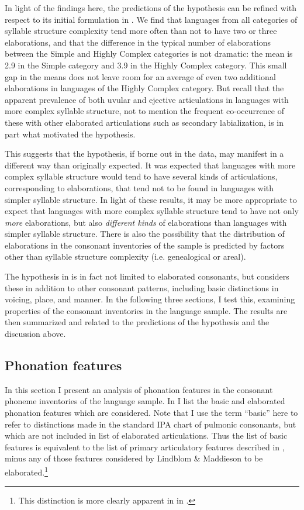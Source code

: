   In light of the findings here, the predictions of the hypothesis can be refined with respect to its initial formulation in . We find that languages from all categories of syllable structure complexity tend more often than not to have two or three elaborations, and that the difference in the typical number of elaborations between the Simple and Highly Complex categories is not dramatic: the mean is 2.9 in the Simple category and 3.9 in the Highly Complex category. This small gap in the means does not leave room for an average of even two additional elaborations in languages of the Highly Complex category. But recall that the apparent prevalence of both uvular and ejective articulations in languages with more complex syllable structure, not to mention the frequent co-occurrence of these with other elaborated articulations such as secondary labialization, is in part what motivated the hypothesis.

  This suggests that the hypothesis, if borne out in the data, may manifest in a different way than originally expected. It was expected that languages with more complex syllable structure would tend to have several kinds of articulations, corresponding to elaborations, that tend not to be found in languages with simpler syllable structure. In light of these results, it may be more appropriate to expect that languages with more complex syllable structure tend to have not only \textit{more} elaborations, but also \textit{different kinds} of elaborations than languages with simpler syllable structure. There is also the possibility that the distribution of elaborations in the consonant inventories of the sample is predicted by factors other than syllable structure complexity (i.e. genealogical or areal).

  The hypothesis in  is in fact not limited to elaborated consonants, but considers these in addition to other consonant patterns, including basic distinctions in voicing, place, and manner. In the following three sections, I test this, examining properties of the consonant inventories in the language sample. The results are then summarized and related to the predictions of the hypothesis and the discussion above.

\subsection{Phonation features}\label{sec:4.4.3}

  In this section I present an analysis of phonation features in the consonant pho\-neme inventories of the language sample. In  I list the basic and elaborated phonation features which are considered. Note that I use the term ``basic'' here to refer to distinctions made in the standard IPA chart of pulmonic consonants, but which are not included in    list of elaborated articulations. Thus the list of basic features is equivalent to the list of primary articulatory features described in , minus any of those features considered by Lindblom \& Maddieson to be elaborated.\footnote{{This distinction is more clearly apparent in  in .}}

